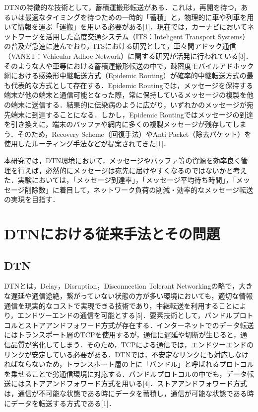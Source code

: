 \documentclass[11pt]{icsthesis}
\begin{document}
DTNの特徴的な技術として，蓄積運搬形転送がある．これは，再開を待つ，あるいは最適なタイミングを待つための一時的「蓄積」と，物理的に車や列車を用いて情報を運ぶ「運搬」を用いる必要がある[1]．現在では，カーナビにおいてネットワークを活用した高度交通システム（ITS：Inteligent Transport Systems）の普及が急速に進んでおり，ITSにおける研究として，車々間アドック通信（VANET：Vehicular Adhoc Network）に関する研究が活発に行われている[3]．そのような人や車等における蓄積運搬形転送の中で，疎密度モバイルアドホック網における感染形中継転送方式（Epidemic Routing）が確率的中継転送方式の最も代表的な方式として存在する．Epidemic Routingでは，メッセージを保持する端末が他の端末と通信可能となった際，常に保持しているメッセージの複製を他の端末に送信する．結果的に伝染病のように広がり，いずれかのメッセージが宛先端末に到達することになる．しかし，Epidemic Routingではメッセージの到達を引き換えに，端末のバッファや網内に多くの複製メッセージが残存してしまう．そのため，Recovery Scheme（回復手法）やAnti Packet（除去パケット）を使用したルーティング手法などが提案されてきた[1]．

本研究では，DTN環境において，メッセージやバッファ等の資源を効率良く管理を行えば，必然的にメッセージは宛先に届けやすくなるのではないかと考えた．実験においては，「メッセージ到達率」，「メッセージ平均待ち時間」，「メッセージ削除数」に着目して，ネットワーク負荷の削減・効率的なメッセージ転送の実現を目指す．

\chapter{DTNにおける従来手法とその問題}
\section{DTN}
DTNとは，Delay，Disruption，Disconnection Tolerant Networkingの略で，大きな遅延や通信途絶，繋がっていない状態の方が多い環境においても，適切な情報通信を現実的なコストで実現できる技術であり，中継転送を利用することにより，エンドツーエンドの通信を可能とする[5]．要素技術として，バンドルプロトコルとストアアンドフォワード方式が存在する．インターネットでのデータ転送にはトランスポート層のTCPを使用するが，通信に遅延や切断が生じると，通信品質が劣化してしまう．そのため，TCPによる通信では，エンドツーエンドのリンクが安定している必要がある．DTNでは，不安定なリンクにも対応しなければならないため，トランスポート層の上に「バンドル」と呼ばれるプロトコルを乗せることで劣通信環境に対応する．バンドルプロトコルの中でも，データ転送にはストアアンドフォワード方式を用いる[4]．ストアアンドフォワード方式は，通信が不可能な状態である時にデータを蓄積し，通信が可能な状態である時にデータを転送する方式である[1]．
\end{document}

